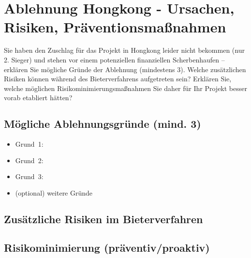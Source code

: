\documentclass[
%
ngerman %
%
numeric %
]{wbh-assignment}
\begin{document}
\clearpage

\section{Ablehnung Hongkong - Ursachen, Risiken, Präventionsmaßnahmen}
\label{sec:hongkong_risiken}

\begin{aufgabenstellung}
Sie haben den Zuschlag für das Projekt in Hongkong leider nicht bekommen (nur 2. Sieger) und stehen vor einem potenziellen finanziellen Scherbenhaufen – erklären Sie mögliche Gründe der Ablehnung (mindestens 3). Welche zusätzlichen Risiken können während des Bieterverfahrens aufgetreten sein? Erklären Sie, welche möglichen Risikominimierungsmaßnahmen Sie daher für Ihr Projekt besser vorab etabliert hätten?
\end{aufgabenstellung}

\vspace*{5mm}

\subsection{Mögliche Ablehnungsgründe (mind. 3)}
\begin{itemize}
  \item Grund~1: %
  \item Grund~2: %
  \item Grund~3: %
  \item (optional) weitere Gründe
\end{itemize}

\subsection{Zusätzliche Risiken im Bieterverfahren}

\subsection{Risikominimierung (präventiv/proaktiv)}
\end{document}
